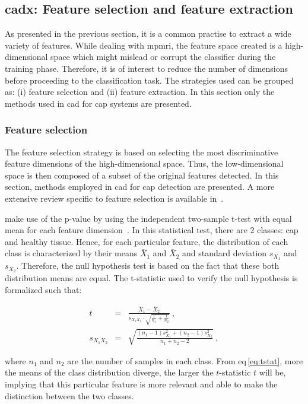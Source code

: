 \subsection{\acs*{cadx}: Feature selection and feature extraction} \label{subsec:chp3:img-clas:CADX-fea-ext}
As presented in the previous section, it is a common practise to extract a wide variety of features.
While dealing with \ac{mpmri}, the feature space created is a high-dimensional space which might mislead or corrupt the classifier during the training phase.
Therefore, it is of interest to reduce the number of dimensions before proceeding to the classification task.
The strategies used can be grouped as: (i) feature selection and (ii) feature extraction.
In this section only the methods used in \ac{cad} for \ac{cap} systems are presented.

\subsubsection{Feature selection}\label{subsubsec:chp3:img-clas:CADX:fea-ext:sel}
The feature selection strategy is based on selecting the most discriminative feature dimensions of the high-dimensional space.
Thus, the low-dimensional space is then composed of a subset of the original features detected.
In this section, methods employed in \ac{cad} for \ac{cap} detection are presented.
A more extensive review specific to feature selection is available in~\cite{Saeys2007}.

\citeauthor{Niaf2012} make use of the p-value by using the independent two-sample t-test with equal mean for each feature dimension~\cite{Niaf2011,Niaf2012}.
In this statistical test, there are 2 classes: \ac{cap} and healthy tissue.
Hence, for each particular feature, the distribution of each class is characterized by their means $\bar{X}_1$ and $\bar{X}_2$ and standard deviation $s_{X_1}$ and $s_{X_2}$.
Therefore, the null hypothesis test is based on the fact that these both distribution means are equal.
The t-statistic used to verify the null hypothesis is formalized such that:

\begin{eqnarray}
t & = & \frac{\bar {X}_1 - \bar{X}_2}{s_{X_1X_2} \cdot \sqrt{\frac{1}{n_1}+\frac{1}{n_2}}} \ , \label{eq:tstat} \\
s_{X_1X_2} & = & \sqrt{\frac{(n_1-1)s_{X_1}^2+(n_2-1)s_{X_2}^2}{n_1+n_2-2}} \ , \nonumber
\end{eqnarray}

\noindent where $n_1$ and $n_2$ are the number of samples in each class.
From \acs{eq}\,\eqref{eq:tstat}, more the means of the class distribution diverge, the larger the $t$-statistic $t$ will be, implying that this particular feature is more relevant and able to make the distinction between the two classes. 

